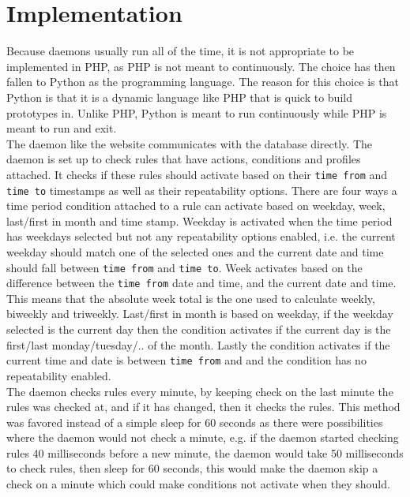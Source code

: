 \section{Implementation}
Because daemons usually run all of the time, it is not appropriate to be implemented in PHP, as PHP is not meant to continuously. The choice has then fallen to Python as the programming language. The reason for this choice is that Python is that it is a dynamic language like PHP that is quick to build prototypes in. Unlike PHP, Python is meant to run continuously while PHP is meant to run and exit. \\
The daemon like the website communicates with the database directly. The daemon is set up to check rules that have actions, conditions and profiles attached. It checks if these rules should activate based on their \texttt{time from} and \texttt{time to} timestamps as well as their repeatability options. There are four ways a time period condition attached to a rule can activate based on weekday, week, last/first in month and time stamp. Weekday is activated when the time period has weekdays selected but not any repeatability options enabled, i.e. the current weekday should match one of the selected ones and the current date and time should fall between \texttt{time from} and \texttt{time to}. Week activates based on the difference between the \texttt{time from} date and time, and the current date and time. This means that the absolute week total is the one used to calculate weekly, biweekly and triweekly. Last/first in month is based on weekday, if the weekday selected is the current day then the condition activates if the current day is the first/last monday/tuesday/.. of the month. Lastly the condition activates if the current time and date is between \texttt{time from} and  and the condition has no repeatability enabled. \\
The daemon checks rules every minute, by keeping check on the last minute the rules was checked at, and if it has changed, then it checks the rules. This method was favored instead of a simple sleep for 60 seconds as there were possibilities where the daemon would not check a minute, e.g. if the daemon started checking rules 40 milliseconds before a new minute, the daemon would take 50 milliseconds to check rules, then sleep for 60 seconds, this would make the daemon skip a check on a minute which could make conditions not activate when they should.